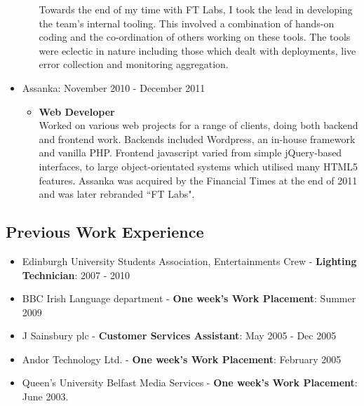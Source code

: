 \documentclass[a4paper]{article}
\begin{document}
\begin{itemize}
\begin{itemize}
Towards the end of my time with FT Labs, I took the lead in developing the team's internal tooling.  This involved a combination of hands-on coding and the co-ordination of others working on these tools.  The tools were eclectic in nature including those which dealt with deployments, live error collection and monitoring aggregation.
\end{itemize}

\item Assanka: November 2010 - December 2011
\begin{itemize}
\item {\bf Web Developer}\\
Worked on various web projects for a range of clients, doing both backend and frontend work. Backends included Wordpress, an in-house framework and vanilla PHP. Frontend javascript varied from simple jQuery-based interfaces, to large object-orientated systems which utilised many HTML5 features.
Assanka was acquired by the Financial Times at the end of 2011 and was later rebranded ``FT Labs".
\end{itemize}

\end{itemize}

\subsection*{Previous Work Experience}
\begin{itemize}

\item Edinburgh University Students Association, Entertainments Crew - {\bf Lighting Technician}: 2007 - 2010
\item BBC Irish Language department - {\bf One week's Work Placement}: Summer 2009
\item J Sainsbury plc - {\bf Customer Services Assistant}: May 2005 - Dec 2005
\item Andor Technology Ltd. - {\bf One week's Work Placement}:  February 2005
\item Queen's University Belfast Media Services - {\bf One week's Work Placement}:  June 2003.


\end{itemize}
\end{document}

